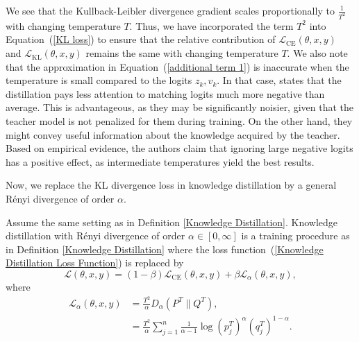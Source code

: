 \begin{rem}
We see that the Kullback-Leibler divergence gradient scales proportionally to $\frac{1}{T^2}$ with changing temperature $T$. Thus, we have incorporated the term $T^2$ into Equation~(\ref{KL loss}) to ensure that the relative contribution of $\mathcal{L}_{\text{CE}}(\theta,x,y)$ and $\mathcal{L}_{\text{KL}}(\theta,x,y)$ remains the same with changing temperature $T$. We also note that the approximation in Equation~(\ref{additional term 1}) is inaccurate when the temperature is small compared to the logits $z_k, v_k$. In that case, \cite{HintonVinyalsDean2015} states that the distillation pays less attention to matching logits much more negative than average. This is advantageous, as they may be significantly noisier, given that the teacher model is not penalized for them during training. On the other hand, they might convey useful information about the knowledge acquired by the teacher. Based on empirical evidence, the authors claim that ignoring large negative logits has a positive effect, as intermediate temperatures yield the best results.
\end{rem}

Now, we replace the KL divergence loss in knowledge distillation by a general Rényi divergence of order $\alpha$. 

\begin{defn}
    Assume the same setting as in Definition \ref{Knowledge Distillation}. Knowledge distillation with Rényi divergence of order $\alpha\in [0,\infty]$ is a training procedure as in Definition \ref{Knowledge Distillation} where the loss function~(\ref{Knowledge Distillation Loss Function}) is replaced by
    \begin{equation}
	\mathcal{L}(\theta,x,y) = (1-\beta) \mathcal{L}_{\text{CE}}(\theta,x,y) + \beta \mathcal{L}_{\alpha}(\theta,x,y),
	\label{Rényi Knowledge Distillation}
\end{equation}
where
\begin{equation}
	\begin{aligned}
		\mathcal{L}_{\alpha}(\theta,x,y) &= \frac{T^2}{\alpha} D_\alpha(P^T \| Q^T),\\
		&=\frac{T^2}{\alpha} \sum_{j=1}^{n} \frac{1}{\alpha-1} \log (p^T_j)^\alpha (q^T_j)^{1-\alpha}.
	\end{aligned}
	\label{Rényi loss}
\end{equation}
\end{defn}

